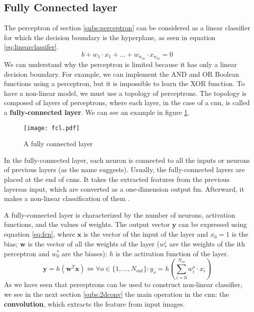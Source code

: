 \subsection{Fully Connected layer} \label{subs:fcl}
The perceptron of section \ref{subs:perceptron} can be considered as a linear classifier for which the decision boundary is the hyperplane, as seen in equation \eqref{eq:linearclassifer}.
%
\begin{equation}
    b + w_1 \cdot x_1 + ... + w_{n_{in}} \cdot x_{n_{in}} = 0
    \label{eq:linearclassifer}
\end{equation}
%
We can understand why the perceptron is limited because it has only a linear decision boundary. For example, we can implement the AND and OR Boolean functions using a perceptron, but it is impossible to learn the XOR function. To have a non-linear model, we must use a topology of perceptrons. The topology is composed of layers of perceptrons, where each layer, in the case of a \acrshort{cnn}, is called a \textbf{fully-connected layer}. We can see an example in figure \ref{fig:fcn}.
%
\begin{figure}
    \centering
    \texttt{[image: fcl.pdf]}
    \caption{A fully connected layer}
    \label{fig:fcn}
\end{figure}

In the fully-connected layer, each neuron is connected to all the inputs or neurons of previous layers (as the name suggests). Usually, the fully-connected layers are placed at the end of \acrshort{cnn}s. It takes the extracted features from the previous layersas input, which are converted as a one-dimension output \acrshort{fm}. Afterward, it makes a non-linear classification of them \cite{khan_survey_2020}.

A fully-connected layer is characterized by the number of neurons, activation functions, and the values of weights. The output vector $\boldsymbol{y}$ can be expressed using equation \eqref{eq:fcn}, where $\boldsymbol{x}$ is the vector of the input of the layer and $x_0 = 1$ is the bias;   $\boldsymbol{w}$ is the vector of all the weights of the layer ($w^i_*$ are the weights of the ith perceptron and $w^*_0$ are the biases); $h$ is the activation function of the layer.
%
\begin{equation}
    \boldsymbol{y} = h(\boldsymbol{w}^T \boldsymbol{x}) \Leftrightarrow \forall o \in \{ 1, ..., N_{out} \} : y_o = h(\sum^{N_{in}}_{i=0} w^o_i \cdot x_i)
    \label{eq:fcn}
\end{equation}
%
As we have seen that perceptrons can be used to construct non-linear classifier, we see in the next section \ref{subs:2dconv} the main operation in the \acrshort{cnn}: the \textbf{convolution}, which extracts the feature from input images.
